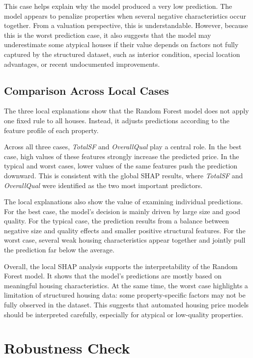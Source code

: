 \documentclass[12pt,a4paper,oneside,openany]{book}
\begin{document}
This case helps explain why the model produced a very low prediction. The model appears to penalize properties when several negative characteristics occur together. From a valuation perspective, this is understandable. However, because this is the worst prediction case, it also suggests that the model may underestimate some atypical houses if their value depends on factors not fully captured by the structured dataset, such as interior condition, special location advantages, or recent undocumented improvements.

\subsection{Comparison Across Local Cases}

The three local explanations show that the Random Forest model does not apply one fixed rule to all houses. Instead, it adjusts predictions according to the feature profile of each property.

Across all three cases, \textit{TotalSF} and \textit{OverallQual} play a central role. In the best case, high values of these features strongly increase the predicted price. In the typical and worst cases, lower values of the same features push the prediction downward. This is consistent with the global SHAP results, where \textit{TotalSF} and \textit{OverallQual} were identified as the two most important predictors.

The local explanations also show the value of examining individual predictions. For the best case, the model's decision is mainly driven by large size and good quality. For the typical case, the prediction results from a balance between negative size and quality effects and smaller positive structural features. For the worst case, several weak housing characteristics appear together and jointly pull the prediction far below the average.

Overall, the local SHAP analysis supports the interpretability of the Random Forest model. It shows that the model's predictions are mostly based on meaningful housing characteristics. At the same time, the worst case highlights a limitation of structured housing data: some property-specific factors may not be fully observed in the dataset. This suggests that automated housing price models should be interpreted carefully, especially for atypical or low-quality properties.


\section{Robustness Check}
\end{document}
